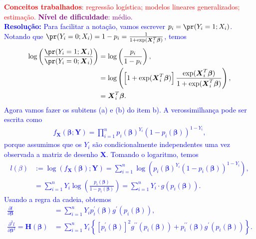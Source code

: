 \textcolor{red}{\textbf{Conceitos trabalhados}: regressão logística; modelos lineares generalizados; estimação.}
\textcolor{purple}{\textbf{Nível de dificuldade}: médio.}\\
\textcolor{blue}{
\textbf{Resolução:}
Para facilitar a notação, vamos escrever $p_i = \pr(Y_i = 1; X_i)$.
Notando que $\pr(Y_i = 0; X_i) = 1-p_i = \frac{1}{1 + \exp( \boldsymbol{X}_i^T\boldsymbol{\beta})}$, temos
\begin{align*}
     \log\left(\frac{\pr(Y_i = 1; \boldsymbol{X}_i)}{\pr(Y_i = 0; \boldsymbol{X}_i)}\right) &=  \log\left(\frac{p_i}{1-p_i}\right),\\
     &= \log\left(\left[1 + \exp( \boldsymbol{X}_i^T\boldsymbol{\beta})\right]\frac{\exp( \boldsymbol{X}_i^T\boldsymbol{\beta})}{1 + \exp( \boldsymbol{X}_i^T\boldsymbol{\beta})}\right),\\
     &= \boldsymbol{X}_i^T\boldsymbol{\beta}.
\end{align*}
Agora vamos fazer os subitens (a) e (b) do item b).
A verossimilhança pode ser escrita como
\begin{align*}
    f_{\boldsymbol{X}}\left(\boldsymbol{\beta}; \boldsymbol{Y}\right) = \prod_{i=1}^n p_i(\boldsymbol{\beta})^{Y_i}\left(1-p_i(\boldsymbol{\beta})\right)^{1-Y_i},
\end{align*}
porque assumimos que os $Y_i$ são condicionalmente independentes uma vez observada a matriz de desenho $\boldsymbol{X}$.
Tomando o logaritmo, temos
\begin{align*}
    l(\beta) &:= \log\left(f_{\boldsymbol{X}}\left(\boldsymbol{\beta}\right); \boldsymbol{Y}\right) = \sum_{i=1}^n \log\left(p_i(\boldsymbol{\beta})^{Y_i}\left(1-p_i(\boldsymbol{\beta})\right)^{1-Y_i}\right),\\
    &= \sum_{i=1}^n Y_i \log\left(\frac{p_i(\boldsymbol{\beta})}{1-p_i(\boldsymbol{\beta})}\right) = \sum_{i=1}^n Y_i \cdot g\left(p_i(\boldsymbol{\beta})\right).
\end{align*}
Usando a regra da cadeia, obtemos
\begin{align*}
    \frac{\partial l}{\partial \boldsymbol{\beta}} &= \sum_{i=1}^n Y_i  p_i^{\prime}(\boldsymbol{\beta})g^\prime(p_i(\boldsymbol{\beta})),\\
    \frac{\partial^2 l }{\partial \boldsymbol{\beta}^2} = \boldsymbol{H}\left(\boldsymbol{\beta}\right) &= \sum_{i=1}^n Y_i  \left\{ \left[p_i^{\prime}(\boldsymbol{\beta})\right]^2 g^{\prime\prime}\left(p_i(\boldsymbol{\beta})\right) + p_i^{\prime\prime}(\boldsymbol{\beta})g^\prime(p_i(\boldsymbol{\beta})) \right\}.

\end{align*}}
